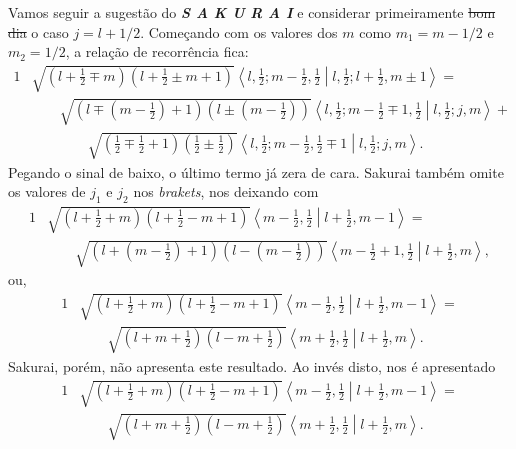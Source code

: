\documentclass{article}
\newcommand{\abraket}[2]{\left\langle #1 \middle| #2 \right\rangle}
\begin{document}
Vamos seguir a sugestão do {\color{magenta} \Large{\uppercase{\textit{\textbf{S a k u r a i}}}}} e considerar primeiramente \st{bom dia} o caso $j = l + 1 \slash 2$.
Começando com os valores dos $m$ como $m_1 = m - 1 \slash 2$ e $m_2 = 1 \slash 2$, a relação de recorrência fica:
\begin{alignat}{1}
\nonumber
 &\sqrt{\left(l + \frac{1}{2} \mp m\right)\left(l + \frac{1}{2} \pm m + 1\right)} \abraket{l,\frac{1}{2};m -
 \frac{1}{2},\frac{1}{2}}{l,\frac{1}{2};l + \frac{1}{2},m\pm1} = \\ \nonumber
 &\qquad \sqrt{\left(l \mp \left(m - \frac{1}{2}\right) + 1\right)\left(l \pm \left(m - \frac{1}{2}\right)\right)}
 \abraket{l,\frac{1}{2};m - \frac{1}{2}\mp1,\frac{1}{2}}{l,\frac{1}{2};j,m} + \\
 &\qquad \qquad \sqrt{\left(\frac{1}{2} \mp \frac{1}{2} + 1\right)\left(\frac{1}{2} \pm \frac{1}{2}\right)}
 \abraket{l,\frac{1}{2};m - \frac{1}{2},\frac{1}{2}\mp1}{l,\frac{1}{2};j,m} \mathrm{.}
\end{alignat}
Pegando o sinal de baixo, o último termo já zera de cara. Sakurai também omite os valores de $j_1$ e $j_2$ nos \textit{brakets}, nos deixando com
\begin{alignat}{1}
\nonumber
 &\sqrt{\left(l + \frac{1}{2} + m\right)\left(l + \frac{1}{2} - m + 1\right)} \abraket{m -
 \frac{1}{2},\frac{1}{2}}{l + \frac{1}{2},m - 1} = \\
 &\qquad \sqrt{\left(l + \left(m - \frac{1}{2}\right) + 1\right)\left(l - \left(m - \frac{1}{2}\right)\right)}
 \abraket{m - \frac{1}{2} + 1,\frac{1}{2}}{l + \frac{1}{2},m}\mathrm{,}
\end{alignat}
ou,
\begin{alignat}{1}
\nonumber
 &\sqrt{\left(l + \frac{1}{2} + m\right)\left(l + \frac{1}{2} - m + 1\right)} \abraket{m -
 \frac{1}{2},\frac{1}{2}}{l + \frac{1}{2},m - 1} = \\
 &\qquad \sqrt{\left(l + m + \frac{1}{2}\right)\left(l - m + \frac{1}{2}\right)}
 \abraket{m + \frac{1}{2},\frac{1}{2}}{l + \frac{1}{2},m}\mathrm{.}
\end{alignat}
Sakurai, porém, não apresenta este resultado. Ao invés disto, nos é apresentado
\begin{alignat}{1}
\nonumber
 &\sqrt{\left(l + \frac{1}{2} + m\right)\left(l + \frac{1}{2} - m + 1\right)} \abraket{m -
 \frac{1}{2},\frac{1}{2}}{l + \frac{1}{2},m - 1} = \\
 &\qquad \sqrt{\left(l + m + \frac{1}{2}\right)\left(l - m + \frac{1}{2}\right)}
 \abraket{m + \frac{1}{2},\frac{1}{2}}{l + \frac{1}{2},m}\mathrm{.}
\end{alignat}
\end{document}
